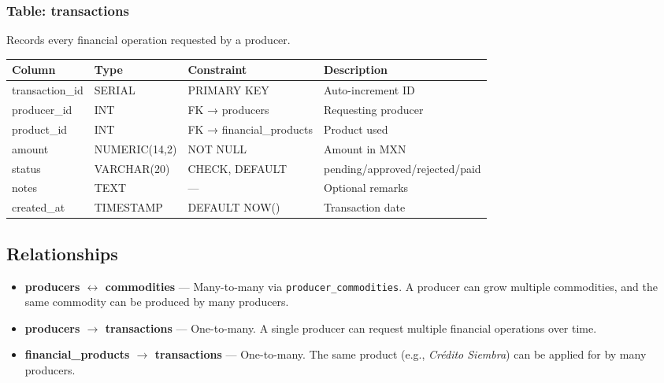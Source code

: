 \documentclass[12pt, a4paper]{article}
\begin{document}
\subsubsection{Table: transactions}

Records every financial operation requested by a producer.

\begin{center}
\begin{tabular}{llll}
  \toprule
  \textbf{Column}    & \textbf{Type}    & \textbf{Constraint}       & \textbf{Description} \\
  \midrule
  transaction\_id & SERIAL        & PRIMARY KEY          & Auto-increment ID \\
  producer\_id    & INT           & FK → producers       & Requesting producer \\
  product\_id     & INT           & FK → financial\_products & Product used \\
  amount          & NUMERIC(14,2) & NOT NULL             & Amount in MXN \\
  status          & VARCHAR(20)   & CHECK, DEFAULT       & pending/approved/rejected/paid \\
  notes           & TEXT          & —                    & Optional remarks \\
  created\_at     & TIMESTAMP     & DEFAULT NOW()        & Transaction date \\
  \bottomrule
\end{tabular}
\end{center}

\subsection{Relationships}

\begin{itemize}[leftmargin=1.5em]
  \item \textbf{producers $\leftrightarrow$ commodities} — Many-to-many via
        \texttt{producer\_commodities}. A producer can grow multiple commodities, and
        the same commodity can be produced by many producers.
  \item \textbf{producers $\rightarrow$ transactions} — One-to-many. A single
        producer can request multiple financial operations over time.
  \item \textbf{financial\_products $\rightarrow$ transactions} — One-to-many.
        The same product (e.g., \textit{Crédito Siembra}) can be applied for by
        many producers.
\end{itemize}
\end{document}
